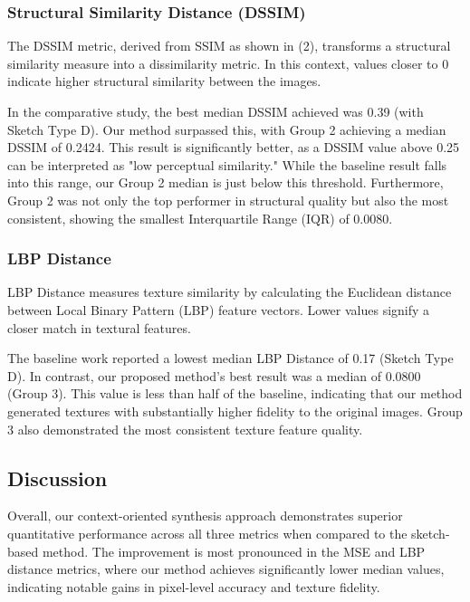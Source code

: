 \documentclass{ieeeaccess}
\begin{document}
\subsubsection{Structural Similarity Distance (DSSIM)}

The DSSIM metric, derived from SSIM as shown in (2), transforms a structural similarity measure into a dissimilarity metric. In this context, values closer to 0 indicate higher structural similarity between the images.

In the comparative study, the best median DSSIM achieved was 0.39 (with Sketch Type D). Our method surpassed this, with Group 2 achieving a median DSSIM of 0.2424. This result is significantly better, as a DSSIM value above 0.25 can be interpreted as "low perceptual similarity." While the baseline result falls into this range, our Group 2 median is just below this threshold. Furthermore, Group 2 was not only the top performer in structural quality but also the most consistent, showing the smallest Interquartile Range (IQR) of 0.0080.

\subsubsection{LBP Distance}

LBP Distance measures texture similarity by calculating the Euclidean distance between Local Binary Pattern (LBP) feature vectors. Lower values signify a closer match in textural features.

The baseline work reported a lowest median LBP Distance of 0.17 (Sketch Type D). In contrast, our proposed method's best result was a median of 0.0800 (Group 3). This value is less than half of the baseline, indicating that our method generated textures with substantially higher fidelity to the original images. Group 3 also demonstrated the most consistent texture feature quality.

\subsection{Discussion}

Overall, our context-oriented synthesis approach demonstrates superior quantitative performance across all three metrics when compared to the sketch-based method. The improvement is most pronounced in the MSE and LBP distance metrics, where our method achieves significantly lower median values, indicating notable gains in pixel-level accuracy and texture fidelity.
\end{document}
